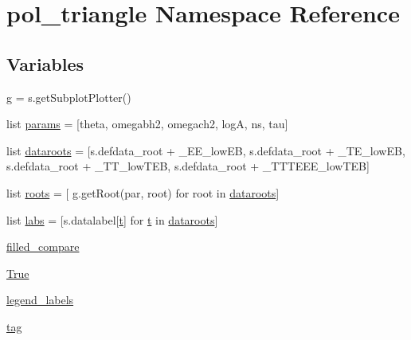\hypertarget{namespacepol__triangle}{}\section{pol\+\_\+triangle Namespace Reference}
\label{namespacepol__triangle}
\subsection*{Variables}
\begin{DoxyCompactItemize}
\item 
\mbox{\hyperlink{namespacepol__triangle_a7234a5113aba05be2b3c2f699b32b23a}{g}} = s.\+get\+Subplot\+Plotter()
\item 
list \mbox{\hyperlink{namespacepol__triangle_a4e724aeef23dd4a82da9b3774488a3f1}{params}} = \mbox{[}\textquotesingle{}theta\textquotesingle{}, \textquotesingle{}omegabh2\textquotesingle{}, \textquotesingle{}omegach2\textquotesingle{}, \textquotesingle{}logA\textquotesingle{}, \textquotesingle{}ns\textquotesingle{}, \textquotesingle{}tau\textquotesingle{}\mbox{]}
\item 
list \mbox{\hyperlink{namespacepol__triangle_a4220a5df3c7ccedd4d483fb63f8cb7a4}{dataroots}} = \mbox{[}s.\+defdata\+\_\+root + \textquotesingle{}\+\_\+\+E\+E\+\_\+low\+EB\textquotesingle{}, s.\+defdata\+\_\+root + \textquotesingle{}\+\_\+\+T\+E\+\_\+low\+EB\textquotesingle{}, s.\+defdata\+\_\+root + \textquotesingle{}\+\_\+\+T\+T\+\_\+low\+T\+EB\textquotesingle{}, s.\+defdata\+\_\+root + \textquotesingle{}\+\_\+\+T\+T\+T\+E\+E\+E\+\_\+low\+T\+EB\textquotesingle{}\mbox{]}
\item 
list \mbox{\hyperlink{namespacepol__triangle_a0232797c8ce2f3f31185ea5456bfc1ca}{roots}} = \mbox{[} g.\+get\+Root(par, root) for root in \mbox{\hyperlink{namespacepol__triangle_a4220a5df3c7ccedd4d483fb63f8cb7a4}{dataroots}}\mbox{]}
\item 
list \mbox{\hyperlink{namespacepol__triangle_adb939a8db664792fc871f7be5390d839}{labs}} = \mbox{[}s.\+datalabel\mbox{[}\mbox{\hyperlink{plotcls_8m_aaccc9105df5383111407fd5b41255e23}{t}}\mbox{]} for \mbox{\hyperlink{plotcls_8m_aaccc9105df5383111407fd5b41255e23}{t}} in \mbox{\hyperlink{namespacepol__triangle_a4220a5df3c7ccedd4d483fb63f8cb7a4}{dataroots}}\mbox{]}
\item 
\mbox{\hyperlink{namespacepol__triangle_a72e3674fd7db5beb02e8d4511c55f6e5}{filled\+\_\+compare}}
\item 
\mbox{\hyperlink{namespacepol__triangle_a0d0c746110786d59686a8c22ed60c7c0}{True}}
\item 
\mbox{\hyperlink{namespacepol__triangle_a98be3676e5b771ea1597f344fa600892}{legend\+\_\+labels}}
\item 
\mbox{\hyperlink{namespacepol__triangle_aabe6a6d0088f0ab2f2088acdefa03cab}{tag}}
\end{DoxyCompactItemize}


